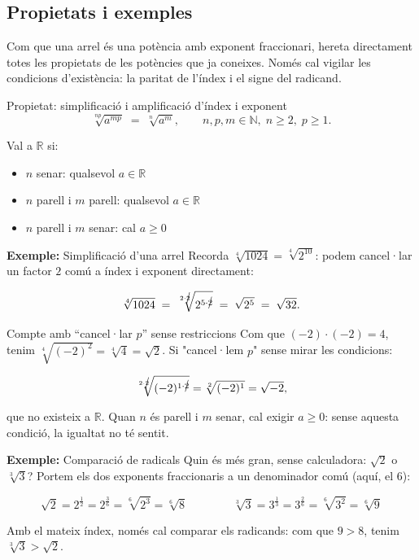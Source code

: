 \subsection{Propietats i exemples}

Com que una arrel és una potència amb exponent fraccionari, hereta directament totes les propietats de les potències que ja coneixes. Només cal vigilar les condicions d'existència: la paritat de l'índex i el signe del radicand.

\begin{propietat}{Propietat: simplificació i amplificació d'índex i exponent}
\[
\sqrt[np]{a^{mp}} \;=\; \sqrt[n]{a^{m}},
\qquad n,p,m \in \mathbb{N},\; n\ge 2,\; p\ge 1.
\]

Val a $\mathbb{R}$ si:

\begin{itemize}
\item $n$ senar: qualsevol $a \in \mathbb{R}$
\item $n$ parell i $m$ parell: qualsevol $a \in \mathbb{R}$
\item $n$ parell i $m$ senar: cal $a \ge 0$
\end{itemize}
\end{propietat}

\begin{exemple}{\textbf{Exemple:} Simplificació d'una arrel}
Recorda $\sqrt[4]{1024}=\sqrt[4]{2^{10}}$: podem cancel·lar un factor $2$ comú a índex i exponent directament:

\[
\sqrt[4]{1024}
\;=\; \sqrt[2\cdot \cancel{2}]{2^{5\cdot \cancel{2}}}
\;=\; \sqrt{2^5}
\;=\; \sqrt{32}.
\]
\end{exemple}

\begin{nota}{Compte amb “cancel·lar $p$” sense restriccions}
Com que $(-2)\cdot(-2)=4$, tenim $\sqrt[4]{(-2)^2}=\sqrt[4]{4}=\sqrt{2}$. Si "cancel·lem $p$" sense mirar les condicions:

\[
\sqrt[2 \cdot \cancel{2}]{(-2)^{1\cdot \cancel{2}}}
=
\sqrt[2]{(-2)^{1}}=\sqrt{-2},
\]

que no existeix a $\mathbb{R}$. Quan $n$ és parell i $m$ senar, cal exigir $a\ge 0$: sense aquesta condició, la igualtat no té sentit.
\end{nota}

\begin{exemple}{\textbf{Exemple:} Comparació de radicals}
Quin és més gran, sense calculadora: $\sqrt{2}$ o $\sqrt[3]{3}$? Portem els dos exponents fraccionaris a un denominador comú (aquí, el $6$):

\[
\sqrt{2} = 2^{\tfrac{1}{2}} = 2^{\tfrac{3}{6}} = \sqrt[6]{2^3} = \sqrt[6]{8}
\qquad\qquad
\sqrt[3]{3} = 3^{\tfrac{1}{3}} = 3^{\tfrac{2}{6}} = \sqrt[6]{3^2} = \sqrt[6]{9}
\]

Amb el mateix índex, només cal comparar els radicands: com que $9>8$, tenim $\sqrt[3]{3} > \sqrt{2}$.
\end{exemple}

